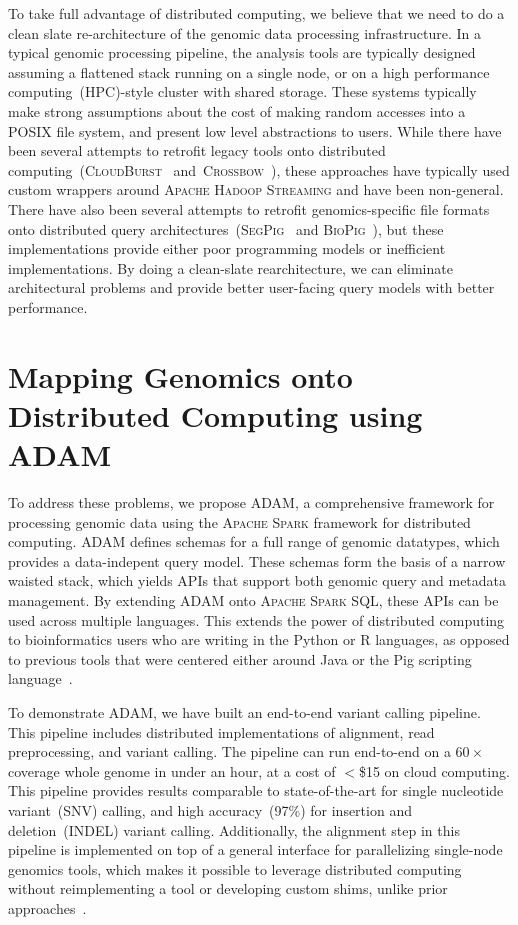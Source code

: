 \documentclass[phd]{ucbthesis}
\begin{document}
To take full advantage of distributed computing, we believe that we need to do a
clean slate re-architecture of the genomic data processing infrastructure. In a
typical genomic processing pipeline, the analysis tools are typically designed
assuming a flattened stack running on a single node, or on a high performance
computing~(HPC)-style cluster with shared storage. These systems typically make
strong assumptions about the cost of making random accesses into a POSIX file
system, and present low level abstractions to users. While there have been
several attempts to retrofit legacy tools onto distributed
computing~(\textsc{CloudBurst}~\cite{schatz09}
and~\textsc{Crossbow}~\cite{langmead09}), these approaches have typically used
custom wrappers around \textsc{Apache Hadoop Streaming} and have been
non-general. There have also been several attempts to retrofit genomics-specific
file formats onto distributed query
architectures~(\textsc{SegPig}~\cite{schumacher14} and
\textsc{BioPig}~\cite{nordberg13}), but these implementations provide either
poor programming models or inefficient implementations. By doing a clean-slate
rearchitecture, we can eliminate architectural problems and provide better
user-facing query models with better performance.

\section{Mapping Genomics onto Distributed Computing using \textsc{ADAM}}
\label{sec:mapping-genomics-to-distributed-computing}

To address these problems, we propose \textsc{ADAM}, a comprehensive framework
for processing genomic data using the \textsc{Apache Spark} framework for
distributed computing. \textsc{ADAM} defines schemas for a full range of genomic
datatypes, which provides a data-indepent query model. These schemas form the
basis of a narrow waisted stack, which yields APIs that support both genomic
query and metadata management. By extending \textsc{ADAM} onto \textsc{Apache
  Spark SQL}, these APIs can be used across multiple languages. This extends the
power of distributed computing to bioinformatics users who are writing in the
Python or R languages, as opposed to previous tools that were centered either
around Java or the Pig scripting language~\cite{nordberg13, schumacher14}.

To demonstrate \textsc{ADAM}, we have built an end-to-end variant calling
pipeline. This pipeline includes distributed implementations of alignment, read
preprocessing, and variant calling. The pipeline can run end-to-end on a
$60\times$ coverage whole genome in under an hour, at a cost of $<$\$15 on
cloud computing. This pipeline provides results comparable to state-of-the-art
for single nucleotide variant~(SNV) calling, and high accuracy~(97\%) for
insertion and deletion~(INDEL) variant calling. Additionally, the alignment
step in this pipeline is implemented on top of a general interface for
parallelizing single-node genomics tools, which makes it possible to leverage
distributed computing without reimplementing a tool or developing custom shims,
unlike prior approaches~\cite{langmead09, schatz09}.
\end{document}
